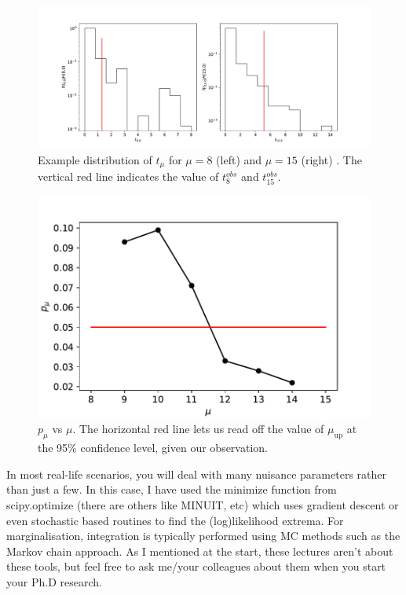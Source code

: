 \begin{figure}
    \centering
    \includegraphics[width=\textwidth]{figures/Hypotest/p10.pdf}
    \caption{Example distribution of $t_{\mu}$ for $\mu=8$ (left) and $\mu=15$ (right) . The vertical red line indicates the value of  $t_{8}^{obs}$ and $t_{15}^{obs}$.}
    \label{fig:tmu_example}
\end{figure}

\begin{figure}
    \centering
    \includegraphics[width=\textwidth]{figures/Hypotest/scan_pmu.pdf}
    \caption{
    $p_{\mu}$ vs $\mu$. The horizontal red line lets us read off the value of $\mu_{\mathrm{up}}$ at the 95\% confidence level, given our observation.}
    \label{fig:pmu_example}
\end{figure}

In most real-life scenarios, you will deal with many nuisance parameters rather than just a few. In this case, I have used the \textsf{minimize} function from \textsf{scipy.optimize} (there are others like \textsf{MINUIT}, etc) which uses   gradient descent or even stochastic based routines to find the (log)likelihood extrema. For marginalisation, integration is typically performed using MC methods such as the Markov chain approach. As I mentioned at the start, these lectures aren't about these tools, but feel free to ask me/your colleagues about them when you start your Ph.D research. 

